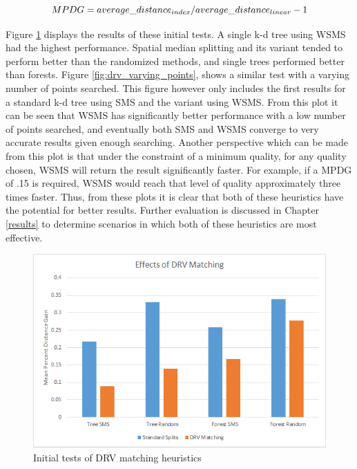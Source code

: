 \begin{equation}
\label{eq:evalmetric}
MPDG = average\_distance_{index} / average\_distance_{linear} - 1 \\
\end{equation}

Figure \ref{fig:drvmatching} displays the results of these initial tests.  A single k-d tree using WSMS had the highest performance.  Spatial median splitting and its variant tended to perform better than the randomized methods, and single trees performed better than forests.  Figure \ref{fig:drv_varying_points}, shows a similar test with a varying number of points searched.  This figure however only includes the first results for a standard k-d tree using SMS and the variant using WSMS.  From this plot it can be seen that WSMS has significantly better performance with a low number of points searched, and eventually both SMS and WSMS converge to very accurate results given enough searching.  Another perspective which can be made from this plot is that under the constraint of a minimum quality, for any quality chosen, WSMS will return the result significantly faster.  For example, if a MPDG of .15 is required, WSMS would reach that level of quality approximately three times faster.  Thus, from these plots it is clear that both of these heuristics have the potential for better results.  Further evaluation is discussed in Chapter \ref{results} to determine scenarios in which both of these heuristics are most effective.

\begin{figure}[h]
\begin{center}
\includegraphics[width=\textwidth]{Figures/sysdesc_drvmatching}
\end{center}
\caption{Initial tests of DRV matching heuristics}
\label{fig:drvmatching}
\end{figure}


